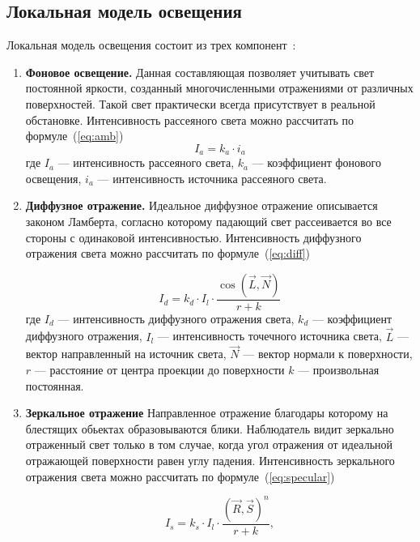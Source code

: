 \subsection{Локальная модель освещения}
Локальная модель освещения состоит из трех компонент~\cite{Phong1975}:

\begin{enumerate}[label=\arabic*)]
	\item \textbf{Фоновое освещение.} Данная составляющая позволяет учитывать свет постоянной яркости, созданный многочисленными отражениями от различных поверхностей. Такой свет практически всегда присутствует в реальной обстановке. Интенсивность  рассеяного света можно рассчитать по формуле~(\ref{eq:amb})
	\begin{equation}\label{eq:amb}
		I_{a} = k_{a} \cdot i_{a}
	\end{equation}
	\noindent где 
	$I_{a}$ --- интенсивность рассеяного света, 
	$k_{a}$ --- коэффициент фонового освещения, 
	$i_{a}$ --- интенсивность источника рассеяного света. 
	
	\item \textbf{Диффузное отражение.} Идеальное диффузное отражение описывается законом Ламберта, согласно которому падающий свет рассеивается во все стороны с одинаковой интенсивностью. Интенсивность диффузного отражения света можно рассчитать по формуле~(\ref{eq:diff})
	
	\begin{equation}\label{eq:diff}
		I_{d} = k_{d} \cdot I_{l} \cdot \frac{\cos(\overrightarrow{L}, \overrightarrow{N})}{r + k}
	\end{equation}
	\noindent где 
	$I_{d}$ --- интенсивность диффузного отражения света, 
	$k_{d}$ --- коэффициент диффузного отражения, 
	$I_{l}$ --- интенсивность точечного источника света,
	$\overrightarrow{L}$ --- вектор направленный на источник света, 
	$\overrightarrow{N}$ --- вектор нормали к поверхности,
	$r$ --- расстояние от центра проекции до поверхности
	$k$ --- произвольная постоянная.
	
	\item \textbf{Зеркальное отражение} Направленное отражение благодары которому на блестящих обьектах образовываются блики. Наблюдатель видит зеркально отраженный свет только в том случае, когда угол отражения от идеальной отражающей поверхности равен углу падения. Интенсивность зеркального отражения света можно рассчитать по формуле~(\ref{eq:specular})
	
	\begin{equation}\label{eq:specular}
		I_{s} = k_{s} \cdot I_{l} \cdot \frac{(\overrightarrow{R}, \overrightarrow{S})^n}{r + k},
	\end{equation}
	

\end{enumerate}
